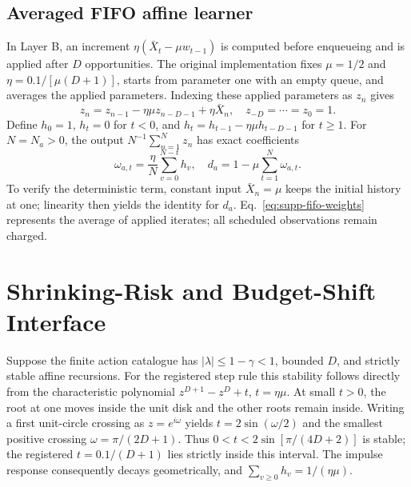 \documentclass[journal]{IEEEtran}
\begin{document}
\subsection{Averaged FIFO affine learner}
In Layer B, an increment $\eta(\bar X_t-\mu w_{t-1})$ is computed before enqueueing and is applied after $D$ opportunities.
The original implementation fixes $\mu=1/2$ and $\eta=0.1/[\mu(D+1)]$, starts from parameter one with an empty queue, and averages the applied parameters.
Indexing these applied parameters as $z_n$ gives
\begin{equation}
z_n=z_{n-1}-\eta\mu z_{n-D-1}+\eta\bar X_n,
\quad z_{-D}=\cdots=z_0=1.
\end{equation}
Define $h_0=1$, $h_t=0$ for $t<0$, and $h_t=h_{t-1}-\eta\mu h_{t-D-1}$ for $t\ge1$.
For $N=N_a>0$, the output $N^{-1}\sum_{n=1}^Nz_n$ has exact coefficients
\begin{equation}
\omega_{a,t}=\frac\eta N\sum_{v=0}^{N-t}h_v,
\quad d_a=1-\mu\sum_{t=1}^N\omega_{a,t}.
\label{eq:supp-fifo-weights}
\end{equation}
To verify the deterministic term, constant input $\bar X_n=\mu$ keeps the initial history at one; linearity then yields the identity for $d_a$.
Eq.~\eqref{eq:supp-fifo-weights} represents the average of applied iterates; all scheduled observations remain charged.

\section{Shrinking-Risk and Budget-Shift Interface}
Suppose the finite action catalogue has $|\lambda|\le1-\gamma<1$, bounded $D$, and strictly stable affine recursions.
For the registered step rule this stability follows directly from the characteristic polynomial $z^{D+1}-z^D+t$, $t=\eta\mu$.
At small $t>0$, the root at one moves inside the unit disk and the other roots remain inside.
Writing a first unit-circle crossing as $z=e^{i\omega}$ yields $t=2\sin(\omega/2)$ and the smallest positive crossing $\omega=\pi/(2D+1)$.
Thus $0<t<2\sin[\pi/(4D+2)]$ is stable; the registered $t=0.1/(D+1)$ lies strictly inside this interval.
The impulse response consequently decays geometrically, and $\sum_{v\ge0}h_v=1/(\eta\mu)$.
\end{document}
